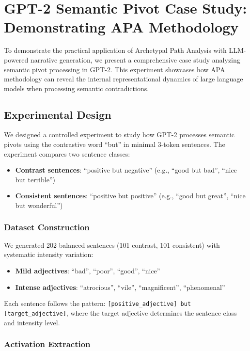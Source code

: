 \section{GPT-2 Semantic Pivot Case Study: Demonstrating APA Methodology}

To demonstrate the practical application of Archetypal Path Analysis with LLM-powered narrative generation, we present a comprehensive case study analyzing semantic pivot processing in GPT-2. This experiment showcases how APA methodology can reveal the internal representational dynamics of large language models when processing semantic contradictions.

\subsection{Experimental Design}

We designed a controlled experiment to study how GPT-2 processes semantic pivots using the contrastive word ``but'' in minimal 3-token sentences. The experiment compares two sentence classes:

\begin{itemize}
    \item \textbf{Contrast sentences}: ``positive but negative'' (e.g., ``good but bad'', ``nice but terrible'')
    \item \textbf{Consistent sentences}: ``positive but positive'' (e.g., ``good but great'', ``nice but wonderful'')
\end{itemize}

\subsubsection{Dataset Construction}

We generated 202 balanced sentences (101 contrast, 101 consistent) with systematic intensity variation:

\begin{itemize}
    \item \textbf{Mild adjectives}: ``bad'', ``poor'', ``good'', ``nice''
    \item \textbf{Intense adjectives}: ``atrocious'', ``vile'', ``magnificent'', ``phenomenal''
\end{itemize}

Each sentence follows the pattern: \texttt{[positive\_adjective] but [target\_adjective]}, where the target adjective determines the sentence class and intensity level.

\subsubsection{Activation Extraction}

